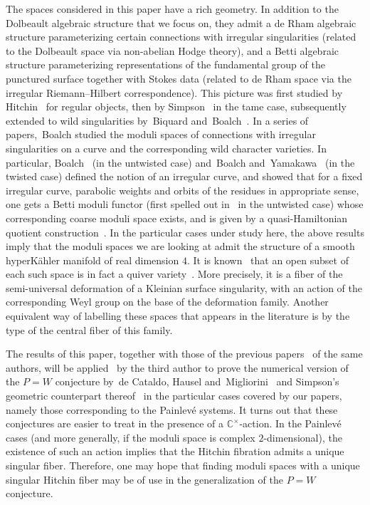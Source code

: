 \documentclass[10pt,a4paper]{amsart}
\newcommand{\C}{{\mathbb C}} %
\numberwithin{equation}{section}
\begin{document}
The spaces considered in this paper have a rich geometry. In
 addition to the Dolbeault algebraic structure that we focus on, they
 admit a de Rham algebraic structure parameterizing certain
 connections with irregular singularities (related to the Dolbeault
 space via non-abelian Hodge theory), and a Betti algebraic structure
 parameterizing representations of the fundamental group of the
 punctured surface together with Stokes data (related to de Rham
 space via the irregular Riemann--Hilbert correspondence). This
 picture was first studied by Hitchin~\cite{Hit_selfduality} for
 regular objects, then by Simpson~\cite{Sim} in the tame case,
 subsequently extended to wild singularities by~Biquard
 and~Boalch~\cite{BB}. In a series of papers,~Boalch studied the
 moduli spaces of connections with irregular singularities on a curve
 and the corresponding wild character varieties. In particular,
 Boalch~\cite{Boalch1} (in the untwisted case) and~Boalch
 and~Yamakawa~\cite{BY} (in the twisted case) defined the notion of
 an irregular curve, and showed that for a fixed irregular curve,
 parabolic weights and orbits of the residues in appropriate sense,
 one gets a Betti moduli functor (first spelled out in~\cite{Boalch3}
 in the untwisted case) whose corresponding coarse moduli space
 exists, and is given by a quasi-Hamiltonian quotient
 construction~\cite{AMM}. In the particular cases under study here,
 the above results imply that the moduli spaces we are looking at
 admit the structure of a smooth hyperK\"ahler manifold of real
 dimension $4$. It is known~\cite{Boalch2, CB, KraftProcesi} that an open
 subset of each such space is in fact a quiver
 variety~\cite{KN}. More precisely, it is a fiber of the
 semi-universal deformation of a Kleinian surface singularity, with
 an action of the corresponding Weyl group on the base of the
 deformation family. Another equivalent way of labelling these spaces
 that appears in the literature is by the type of the central fiber
 of this family.

The results of this paper, together with those of the previous
 papers~\cite{ISS, ISS2} of the same \mbox{authors}, will be
 applied~\cite{Sz_PW} by the third author to prove the numerical
 version of the \mbox{$P=W$} conjecture by~de Cataldo, Hausel
 and~Migliorini~\cite{dCHM} and Simpson's geometric counterpart
 thereof~\cite{Sim_boundary} in the particular cases covered by our
 papers, namely those corresponding to the Painlev\'e systems. It
 turns out that these conjectures are easier to treat in the presence
 of a $\C^{\times}$-action. In the Painlev\'e cases (and more
 generally, if the moduli space is complex $2$-dimensional), the
 existence of such an action implies that the Hitchin fibration
 admits a unique singular fiber. Therefore, one may hope that finding
 moduli spaces with a unique singular Hitchin fiber may be of use in
 the generalization of the $P=W$ conjecture.
\end{document}
